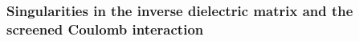 \documentclass[twocolumn,prb,showpacs,superscriptaddress]{revtex4}
\def\w{\omega}
\def\H{\hat{H}}
\def\P{\hat{P}_{\rm occ}}
\def\E{\varepsilon}
\def\q{{\bf q}}
\def\k{{\bf k}}
\def\G{{\bf G}}
\begin{document}

\subsubsection{Singularities in the inverse dielectric matrix and the screened Coulomb interaction}
\end{document}
